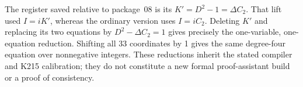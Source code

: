 The register saved relative to package~08 is its
\(K'=D^2-1=\Delta C_2\). That lift used \(I=iK'\), whereas the ordinary
version uses \(I=iC_2\). Deleting \(K'\) and replacing its two equations
by \(D^2-\Delta C_2=1\) gives precisely the one-variable, one-equation
reduction. Shifting all 33 coordinates by 1 gives the same degree-four
equation over nonnegative integers. These reductions inherit the stated
compiler and K215 calibration; they do not constitute a new formal
proof-assistant build or a proof of consistency.

